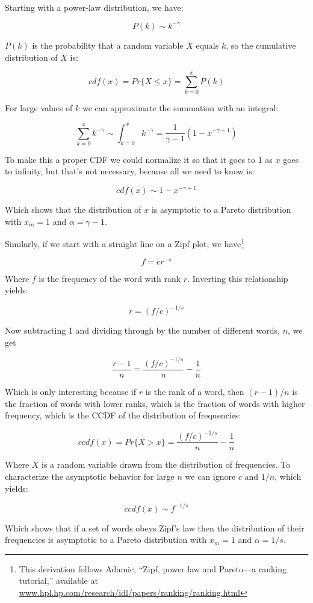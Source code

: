 \documentclass[10pt]{book}
\begin{document}
Starting with a power-law distribution, we have:

\[ P(k) \sim k^{- \gamma} \]

$P(k)$ is the probability that a random variable $X$ equals $k$,
so the cumulative distribution of $X$ is:

\[ cdf(x) = Pr\{X \le x \} = \sum_{k=0}^x P(k) \]

For large values of $k$ we can approximate the summation with
an integral:

\[ \sum_{k=0}^x k^{- \gamma} \sim \int_{k=0}^x k^{- \gamma} = 
\frac{1}{\gamma -1} (1 - x^{-\gamma + 1}) \]

To make this a proper CDF we could normalize it so that it
goes to 1 as $x$ goes to infinity, but that's not necessary,
because all we need to know is:

\[ cdf(x) \sim 1 - x^{-\gamma + 1} \]

Which shows that the distribution of $x$ is asymptotic to a
Pareto distribution with $x_m = 1$ and $\alpha = \gamma - 1$.

Similarly, if we start with a straight line on a Zipf plot,
we have\footnote{This derivation follows
Adamic, ``Zipf, power law and
Pareto---a ranking tutorial,'' available at
\url{www.hpl.hp.com/research/idl/papers/ranking/ranking.html}}

\[ f = c r^{-s} \]

Where $f$ is the frequency of the word with rank $r$.  Inverting
this relationship yields:

\[ r = (f/c)^{-{1/s}} \]

Now subtracting 1 and dividing through by the number of different
words, $n$, we get

\[ \frac{r-1}{n} = \frac{(f/c)^{-{1/s}}}{n} - \frac{1}{n} \]

Which is only interesting because if $r$ is the rank of a word,
then $(r-1)/n$ is the fraction of words with lower ranks, which is
the fraction of words with higher frequency, which is the
CCDF of the distribution of frequencies:

\[ ccdf(x) = Pr\{X > x \} = \frac{(f/c)^{-{1/s}}}{n} - \frac{1}{n} \]

Where $X$ is a random variable drawn from the distribution of
frequencies.  To characterize the asymptotic behavior
for large $n$ we can ignore $c$ and $1/n$, which yields:

\[ ccdf(x) \sim f^{-{1/s}} \]

Which shows that if a set of words obeys Zipf's law then the
distribution of their frequencies is asymptotic to a
Pareto distribution with $x_m = 1$ and $\alpha = 1/s$.
\end{document}

